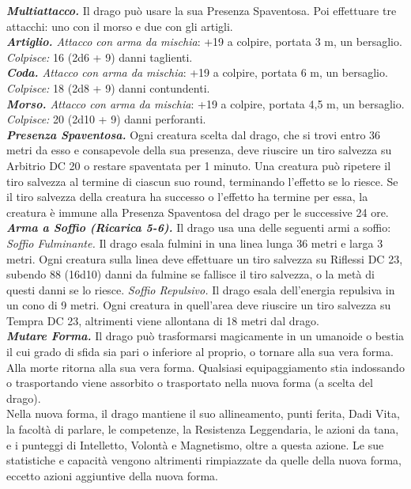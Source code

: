 \begin{multicols}{2}
\emph{\textbf{Multiattacco.}} Il drago può usare la sua Presenza Spaventosa. Poi effettuare tre attacchi: uno con il morso e due con gli artigli.\\
\emph{\textbf{Artiglio.} Attacco con arma da mischia}: +19 a colpire, portata 3 m, un bersaglio.\\
\emph{Colpisce:} 16 (2d6 + 9) danni taglienti.\\
\emph{\textbf{Coda.} Attacco con arma da mischia}: +19 a colpire, portata 6 m, un bersaglio.\\
\emph{Colpisce:} 18 (2d8 + 9) danni contundenti.\\
\emph{\textbf{Morso.} Attacco con arma da mischia}: +19 a colpire, portata 4,5 m, un bersaglio.\\
\emph{Colpisce:} 20 (2d10 + 9) danni perforanti.\\
\emph{\textbf{Presenza Spaventosa.}} Ogni creatura scelta dal drago, che si trovi entro 36 metri da esso e consapevole della sua presenza, deve riuscire un tiro salvezza su Arbitrio DC 20 o restare spaventata per 1 minuto. Una creatura può ripetere il tiro salvezza al termine di ciascun suo round, terminando l'effetto se lo riesce. Se il tiro salvezza della creatura ha successo o l'effetto ha termine per essa, la creatura è immune alla Presenza Spaventosa del drago per le successive 24 ore.\\
\emph{\textbf{Arma a Soffio (Ricarica 5-6).}} Il drago usa una delle seguenti armi a soffio:\\
\emph{Soffio Fulminante.} Il drago esala fulmini in una linea lunga 36 metri e larga 3 metri. Ogni creatura sulla linea deve effettuare un tiro salvezza su Riflessi DC 23, subendo 88 (16d10) danni da fulmine se fallisce il tiro salvezza, o la metà di questi danni se lo riesce. \emph{Soffio Repulsivo.} Il drago esala dell'energia repulsiva in un cono di 9 metri. Ogni creatura in quell'area deve riuscire un tiro salvezza su Tempra DC 23, altrimenti viene allontana di 18 metri dal drago.\\
\emph{\textbf{Mutare Forma.}} Il drago può trasformarsi magicamente in un umanoide o bestia il cui grado di sfida sia pari o inferiore al proprio, o tornare alla sua vera forma. Alla morte ritorna alla sua vera forma. Qualsiasi equipaggiamento stia indossando o trasportando viene assorbito o trasportato nella nuova forma (a scelta del drago).\\
Nella nuova forma, il drago mantiene il suo allineamento, punti ferita, Dadi Vita, la facoltà di parlare, le competenze, la Resistenza Leggendaria, le azioni da tana, e i punteggi di Intelletto, Volontà e Magnetismo, oltre a questa azione. Le sue statistiche e capacità vengono altrimenti rimpiazzate da quelle della nuova forma, eccetto azioni aggiuntive della nuova forma.\\

\end{multicols}
